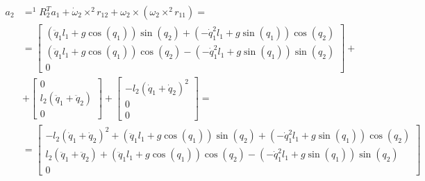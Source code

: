 \documentclass[a4paper,14pt]{extreport}
\begin{document}
\begin{itemize}
\begin{align*}
a_2 &= ^1R_2^T a_1 + \dot \omega_2 \times ^2r_{12} + \omega_2 \times (\omega_2 \times ^2r_{11}) = \\
&=
\left[\begin{matrix}\left(\ddot{q}_1 l_{1} + g \cos{\left (q_{1} \right )}\right) \sin{\left (q_{2} \right )} + \left(- \dot{q}_1^{2} l_{1} + g \sin{\left (q_{1} \right )}\right) \cos{\left (q_{2} \right )}\\\left(\ddot{q}_1 l_{1} + g \cos{\left (q_{1} \right )}\right) \cos{\left (q_{2} \right )} - \left(- \dot{q}_1^{2} l_{1} + g \sin{\left (q_{1} \right )}\right) \sin{\left (q_{2} \right )}\\0\end{matrix}\right]
+\\
&+
\left[\begin{matrix}0\\l_{2} \left(\ddot{q}_1 + \ddot{q}_2\right)\\0\end{matrix}\right]
+
\left[\begin{matrix}- l_{2} \left(\dot{q}_1 + \dot{q}_2\right)^{2}\\0\\0\end{matrix}\right]
=\\
&=
\left[\begin{matrix}- l_{2} \left(\dot{q}_1 + \dot{q}_2\right)^{2} + \left(\ddot{q}_1 l_{1} + g \cos{\left (q_{1} \right )}\right) \sin{\left (q_{2} \right )} + \left(- \dot{q}_1^{2} l_{1} + g \sin{\left (q_{1} \right )}\right) \cos{\left (q_{2} \right )}\\l_{2} \left(\ddot{q}_1 + \ddot{q}_2\right) + \left(\ddot{q}_1 l_{1} + g \cos{\left (q_{1} \right )}\right) \cos{\left (q_{2} \right )} - \left(- \dot{q}_1^{2} l_{1} + g \sin{\left (q_{1} \right )}\right) \sin{\left (q_{2} \right )}\\0\end{matrix}\right]
\end{align*}


\end{itemize}
\end{document}
